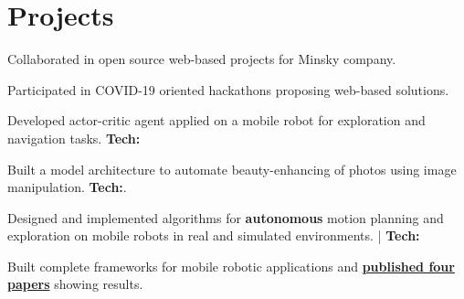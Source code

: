 \documentclass[]{resume-openfont}
\begin{document}
\begin{minipage}[t]{0.95\linewidth}

\section{Projects}
\begin{tightemize}
    \item Collaborated in open source web-based projects for Minsky company.
    \item Participated in COVID-19 oriented hackathons proposing web-based solutions.
\end{tightemize}

\begin{tightemize}
    \item Developed actor-critic agent applied on a mobile robot for exploration and navigation tasks. \textbf{Tech:}   
\end{tightemize}

\begin{tightemize}
    \item Built a model architecture to automate beauty-enhancing of photos using image manipulation. \textbf{Tech:}.
\end{tightemize}
\begin{tightemize}
    \item Designed and implemented algorithms for \textbf{autonomous} motion planning and exploration on mobile robots in real and simulated environments. | \textbf{Tech:} 
    \item Built complete frameworks for mobile robotic applications and \href{https://scholar.google.com/citations?user=KjixlLsAAAAJ&hl=es&oi=ao}{\textbf{published four papers}} showing results. 
\end{tightemize}



\end{minipage}
\end{document}
